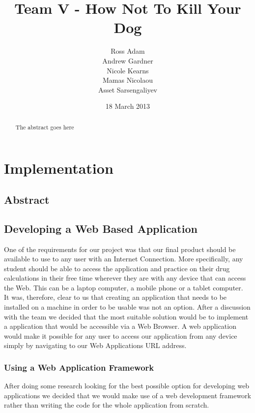 \documentclass{l3proj}
\begin{document}
\title{Team V - How Not To Kill Your Dog}
\author{Ross Adam \\
        Andrew Gardner \\
        Nicole Kearns \\
        Mamas Nicolaou \\
        Asset Sarsengaliyev}
\date{18 March 2013}
\maketitle
\begin{abstract}

The abstract goes here

\end{abstract}
\educationalconsent
\tableofcontents

\chapter{Implementation}
\label{implementation}
\section{Abstract}
\section{Developing a Web Based Application }
One of the requirements for our project was that our final product should be available to 
use to any user with an Internet Connection. More specifically, any student should be 
able to access the application and practice on their drug calculations in their free time 
wherever they are with any device that can access the Web. This can be a laptop 
computer, a mobile phone or a tablet computer. \\ 
It was, therefore, clear to us that creating an application that needs to be installed on a 
machine in order to be usable was not an option. After a discussion with the team we 
decided that the most suitable solution would be to implement a application that would be 
accessible via a Web Browser. A web application would make it possible for any user to 
access our application from any device simply by navigating to our Web Applications 
URL address. \\ 

\subsection {Using a Web Application Framework}
After doing some research looking for the best possible option for developing web 
applications we decided that we would make use of a web development framework 
rather than writing the code for the whole application from scratch.
\end{document}
